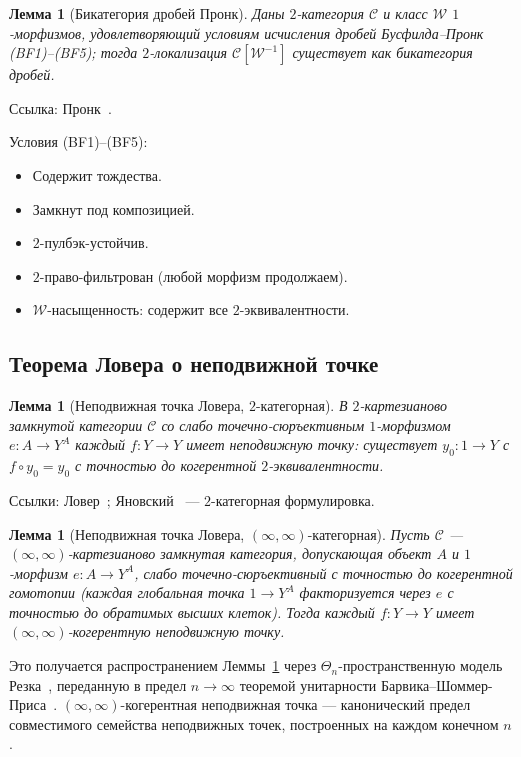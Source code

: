 \documentclass[11pt]{article}
\theoremstyle{plain}
\newtheorem{lemma}[theorem]{Лемма}
\theoremstyle{definition}
\newcommand{\cC}{\mathcal{C}}
\begin{document}
\begin{lemma}[Бикатегория дробей Пронк]\label{lem:pronk}
Даны $2$-категория $\cC$ и класс $\mathcal{W}$ $1$-морфизмов, удовлетворяющий условиям исчисления дробей Бусфилда--Пронк (BF1)--(BF5); тогда $2$-локализация $\cC[\mathcal{W}^{-1}]$ существует как бикатегория дробей.
\end{lemma}

Ссылка: Пронк~\cite{Pronk1996}.

Условия (BF1)--(BF5):
\begin{itemize}
\item[\textbf{(BF1)}] Содержит тождества.
\item[\textbf{(BF2)}] Замкнут под композицией.
\item[\textbf{(BF3)}] $2$-пулбэк-устойчив.
\item[\textbf{(BF4)}] $2$-право-фильтрован (любой морфизм продолжаем).
\item[\textbf{(BF5)}] $\mathcal{W}$-насыщенность: содержит все $2$-эквивалентности.
\end{itemize}

\subsection{Теорема Ловера о неподвижной точке}

\begin{lemma}[Неподвижная точка Ловера, $2$-категорная]\label{lem:lawvere-2}
В $2$-картезианово замкнутой категории $\cC$ со слабо точечно-сюръективным $1$-морфизмом $e : A \to Y^A$ каждый $f : Y \to Y$ имеет неподвижную точку: существует $y_0 : 1 \to Y$ с $f \circ y_0 = y_0$ с точностью до когерентной $2$-эквивалентности.
\end{lemma}

Ссылки: Ловер~\cite{Lawvere1969}; Яновский~\cite{Yanofsky2003} — $2$-категорная формулировка.

\begin{lemma}[Неподвижная точка Ловера, $(\infty, \infty)$-категорная]\label{lem:lawvere-inf}
Пусть $\cC$ — $(\infty, \infty)$-картезианово замкнутая категория, допускающая объект $A$ и $1$-морфизм $e : A \to Y^A$, \emph{слабо точечно-сюръективный с точностью до когерентной гомотопии} (каждая глобальная точка $1 \to Y^A$ факторизуется через $e$ с точностью до обратимых высших клеток). Тогда каждый $f : Y \to Y$ имеет $(\infty, \infty)$-когерентную неподвижную точку.
\end{lemma}

Это получается распространением Леммы~\ref{lem:lawvere-2} через $\Theta_n$-пространственную модель Резка~\cite{Rezk2010}, переданную в предел $n \to \infty$ теоремой унитарности Барвика--Шоммер-Приса~\cite{BarwickSchommerPries2021}. $(\infty, \infty)$-когерентная неподвижная точка — канонический предел совместимого семейства неподвижных точек, построенных на каждом конечном $n$.
\end{document}
